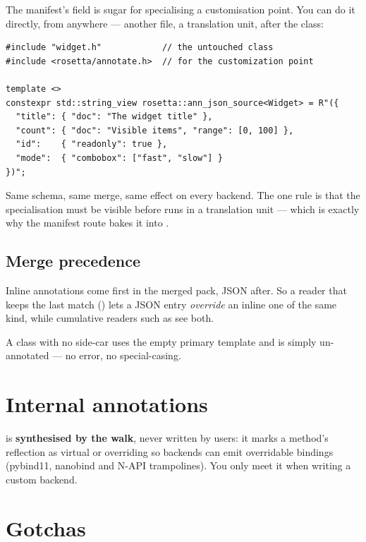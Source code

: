The manifest's  field is sugar for specialising a
customisation point. You can do it directly, from anywhere --- another file, a
translation unit, after the class:

\begin{lstlisting}[style=cpp]
#include "widget.h"            // the untouched class
#include <rosetta/annotate.h>  // for the customization point

template <>
constexpr std::string_view rosetta::ann_json_source<Widget> = R"({
  "title": { "doc": "The widget title" },
  "count": { "doc": "Visible items", "range": [0, 100] },
  "id":    { "readonly": true },
  "mode":  { "combobox": ["fast", "slow"] }
})";
\end{lstlisting}

Same schema, same merge, same effect on every backend. The one rule is that the
specialisation must be visible before  runs in a
translation unit --- which is exactly why the manifest route bakes it into
.

\subsection{Merge precedence}

Inline annotations come first in the merged pack, JSON after. So a reader that
keeps the last match () lets a JSON entry \emph{override}
an inline one of the same kind, while cumulative readers such as  see
both.

A class with no side-car uses the empty primary template and is simply
un-annotated --- no error, no special-casing.

\section{Internal annotations}

 is \textbf{synthesised by the walk}, never written
by users: it marks a method's reflection as virtual or overriding so backends
can emit overridable bindings (pybind11, nanobind and N-API trampolines). You only meet it
when writing a custom backend.

\section{Gotchas}

